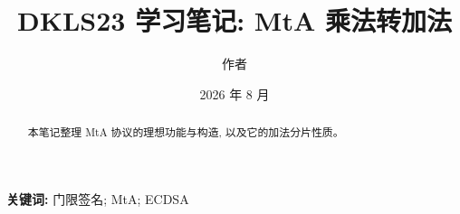 \documentclass[11pt]{article}
\title{DKLS23 学习笔记: MtA 乘法转加法}
\author{作者}
\date{2026 年 8 月}
\begin{document}
\maketitle

\begin{abstract}
本笔记整理 MtA 协议的理想功能与构造, 以及它的加法分片性质。
\end{abstract}

\noindent\textbf{关键词:} 门限签名; MtA; ECDSA


\end{document}
